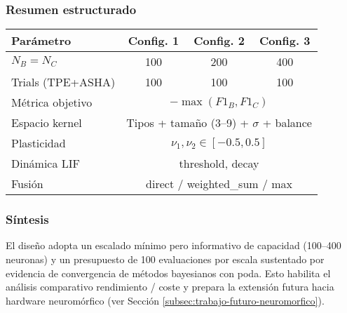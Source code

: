 \subsubsection{Resumen estructurado}
\begin{center}
\begin{tabular}{lccc}
\hline
Parámetro & Config. 1 & Config. 2 & Config. 3 \\
\hline
$N_B = N_C$ & 100 & 200 & 400 \\
Trials (TPE+ASHA) & 100 & 100 & 100 \\
Métrica objetivo & \multicolumn{3}{c}{$-\max(F1_B,F1_C)$} \\
Espacio kernel & \multicolumn{3}{c}{Tipos + tamaño (3--9) + $\sigma$ + balance} \\
Plasticidad & \multicolumn{3}{c}{$\nu_1,\nu_2 \in [-0.5,0.5]$} \\
Dinámica LIF & \multicolumn{3}{c}{threshold, decay} \\
Fusión & \multicolumn{3}{c}{direct / weighted\_sum / max} \\
\hline
\end{tabular}
\end{center}

\subsubsection{Síntesis}
El diseño adopta un escalado mínimo pero informativo de capacidad (100–400 neuronas) y un presupuesto de 100 evaluaciones por escala sustentado por evidencia de convergencia de métodos bayesianos con poda. Esto habilita el análisis comparativo rendimiento / coste y prepara la extensión futura hacia hardware neuromórfico (ver Sección \ref{subsec:trabajo-futuro-neuromorfico}).



